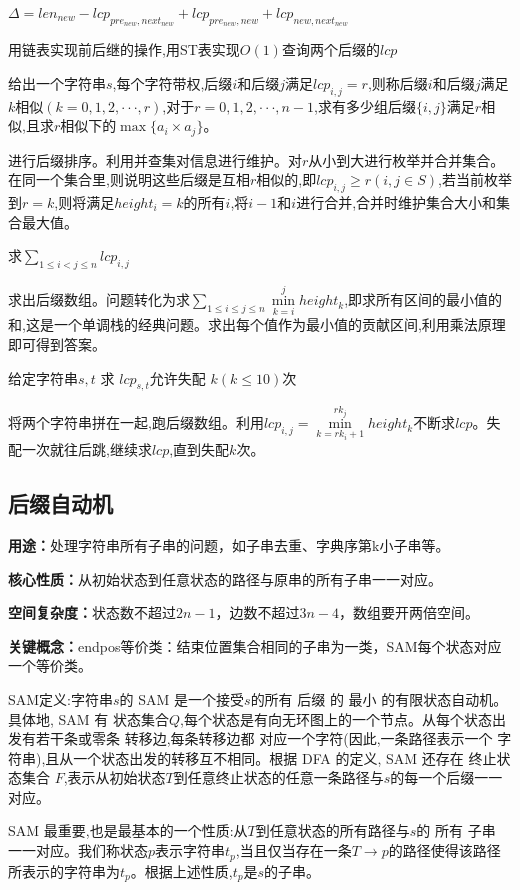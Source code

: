 \documentclass[a4paper, fontset=none]{ctexart}
\begin{document}
$\Delta=len_{new}-lcp_{pre_{new}, next_{new}}+lcp_{pre_{new}, new}+lcp_{new, next_{new}}$ 

用链表实现前后继的操作,用ST表实现$O(1)$查询两个后缀的$lcp$

给出一个字符串$s$,每个字符带权,后缀$i$和后缀$j$满足$lcp_{i, j}=r$,则称后缀$i$和后缀$j$满足$k$相似$(k=0, 1, 2,···, r)$,对于$r=0, 1, 2,···, n-1$,求有多少组后缀$\{i, j\}$满足$r$相似,且求$r$相似下的$\max\{a_i\times a_j\}$。

进行后缀排序。利用并查集对信息进行维护。对$r$从小到大进行枚举并合并集合。在同一个集合里,则说明这些后缀是互相$r$相似的,即$lcp_{i, j}\ge r(i, j\in S)$,若当前枚举到$r=k$,则将满足$height_i=k$的所有$i$,将$i-1$和$i$进行合并,合并时维护集合大小和集合最大值。

求$\sum\limits_{1\leqslant i < j\leqslant n}lcp_{i, j}$

求出后缀数组。问题转化为求$\sum\limits_{1\leqslant i\leqslant j\leqslant n}\min\limits_{k=i}^jheight_{k}$,即求所有区间的最小值的和,这是一个单调栈的经典问题。求出每个值作为最小值的贡献区间,利用乘法原理即可得到答案。

给定字符串$s, t$ 求 $lcp_{s, t}$允许失配 $k(k\leqslant 10)$次

将两个字符串拼在一起,跑后缀数组。利用$lcp_{i, j}=\min\limits_{k=rk_i+1}^{rk_j}height_k$不断求$lcp$。失配一次就往后跳,继续求$lcp$,直到失配$k$次。
\subsection{后缀自动机}
\textbf{用途：}处理字符串所有子串的问题，如子串去重、字典序第k小子串等。

\textbf{核心性质：}从初始状态到任意状态的路径与原串的所有子串一一对应。

\textbf{空间复杂度：}状态数不超过$2n-1$，边数不超过$3n-4$，数组要开两倍空间。

\textbf{关键概念：}endpos等价类：结束位置集合相同的子串为一类，SAM每个状态对应一个等价类。

SAM定义:字符串$s$的 SAM 是一个接受$s$的所有 后缀 的 最小 的有限状态自动机。具体地, SAM 有 状态集合$Q$,每个状态是有向无环图上的一个节点。从每个状态出发有若干条或零条 转移边,每条转移边都 对应一个字符(因此,一条路径表示一个 字符串),且从一个状态出发的转移互不相同。根据 DFA 的定义, SAM 还存在 终止状态集合 $F$,表示从初始状态$T$到任意终止状态的任意一条路径与$s$的每一个后缀一一对应。

SAM 最重要,也是最基本的一个性质:从$T$到任意状态的所有路径与$s$的 所有 子串 一一对应。我们称状态$p$表示字符串$t_p$,当且仅当存在一条$T\rightarrow p$的路径使得该路径所表示的字符串为$t_p$。根据上述性质,$t_p$是$s$的子串。
\end{document}
